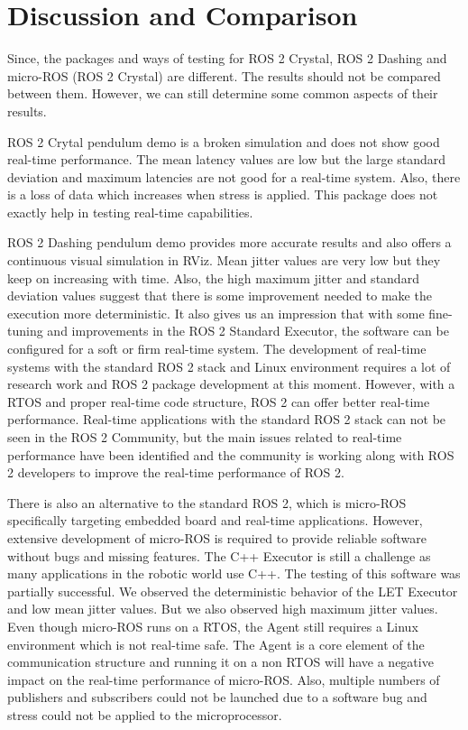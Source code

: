 \documentclass[%
xelatex,
	oneside,		%
	12pt,			%
	parskip=half,	%
	abstracton,
	chapterprefix=true%
    appendixprefix=true]
{scrbook}
\begin{document}
		\section{Discussion and Comparison}
		\vspace*{0.25cm}
	Since, the packages and ways of testing for ROS 2 Crystal, ROS 2 Dashing and micro-ROS (ROS 2 Crystal) are different. The results should not be compared between them. However, we can still determine some common aspects of their results.
	
	ROS 2 Crytal pendulum demo is a broken simulation and does not show good real-time performance. The mean latency values are low but the large standard deviation and maximum latencies are not good for a real-time system. Also, there is a loss of data which increases when stress is applied. This package does not exactly help in testing real-time capabilities.
	\vspace*{0.25cm}
	
	ROS 2 Dashing pendulum demo provides more accurate results and also offers a continuous visual simulation in RViz. Mean jitter values are very low but they keep on increasing with time. Also, the high maximum jitter and standard deviation values suggest that there is some improvement needed to make the execution more deterministic. It also gives us an impression that with some fine-tuning and improvements in the ROS 2 Standard Executor, the software can be configured for a soft or firm real-time system. The development of real-time systems with the standard ROS 2 stack and Linux environment requires a lot of research work and ROS 2 package development at this moment. However, with a RTOS and proper real-time code structure, ROS 2 can offer better real-time performance. Real-time applications with the standard ROS 2 stack can not be seen in the ROS 2 Community, but the main issues related to real-time performance have been identified and the community is working along with ROS 2 developers to improve the real-time performance of ROS 2.
	
	\vspace*{0.25cm}
	There is also an alternative to the standard ROS 2, which is micro-ROS specifically targeting embedded board and real-time applications. However, extensive development of micro-ROS is required to provide reliable software without bugs and missing features. The C++ Executor is still a challenge as many applications in the robotic world use C++. The testing of this software was partially successful. We observed the deterministic behavior of the LET Executor and low mean jitter values. But we also observed high maximum jitter values. Even though micro-ROS runs on a RTOS, the Agent still requires a Linux environment which is not real-time safe. The Agent is a core element of the communication structure and running it on a non RTOS will have a negative impact on the real-time performance of micro-ROS. Also, multiple numbers of publishers and subscribers could not be launched due to a software bug and stress could not be applied to the microprocessor.
\end{document}
